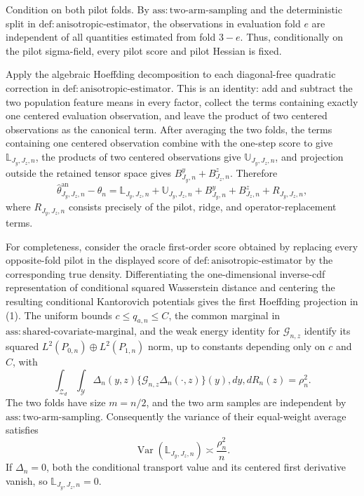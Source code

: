 Condition on both pilot folds.  By \(\mathrm{ass{:}two\text{-}arm\text{-}sampling}\) and the deterministic split in \(\mathrm{def{:}anisotropic\text{-}estimator}\), the observations in evaluation fold \(e\) are independent of all quantities estimated from fold \(3-e\).  Thus, conditionally on the pilot sigma-field, every pilot score and pilot Hessian is fixed.

Apply the algebraic Hoeffding decomposition to each diagonal-free quadratic correction in \(\mathrm{def{:}anisotropic\text{-}estimator}\).  This is an identity: add and subtract the two population feature means in every factor, collect the terms containing exactly one centered evaluation observation, and leave the product of two centered observations as the canonical term.  After averaging the two folds, the terms containing one centered observation combine with the one-step score to give \(\mathbb L_{J_y,J_z,n}\), the products of two centered observations give \(\mathbb U_{J_y,J_z,n}\), and projection outside the retained tensor space gives \(B^y_{J_y,n}+B^z_{J_z,n}\).  Therefore
\[
\widehat\theta^{\mathrm{an}}_{J_y,J_z,n}-\theta_n
=\mathbb L_{J_y,J_z,n}+\mathbb U_{J_y,J_z,n}
+B^y_{J_y,n}+B^z_{J_z,n}+R_{J_y,J_z,n},                                  \tag{1}
\]
where \(R_{J_y,J_z,n}\) consists precisely of the pilot, ridge, and operator-replacement terms.

For completeness, consider the oracle first-order score obtained by replacing every opposite-fold pilot in the displayed score of \(\mathrm{def{:}anisotropic\text{-}estimator}\) by the corresponding true density.  Differentiating the one-dimensional inverse-cdf representation of conditional squared Wasserstein distance and centering the resulting conditional Kantorovich potentials gives the first Hoeffding projection in (1).  The uniform bounds \(c\le q_{a,n}\le C\), the common marginal in \(\mathrm{ass{:}shared\text{-}covariate\text{-}marginal}\), and the weak energy identity for \(\mathcal G_{n,z}\) identify its squared \(L^2(P_{0,n})\oplus L^2(P_{1,n})\) norm, up to constants depending only on \(c\) and \(C\), with
\[
\int_{\mathcal Z_d}\int_{\mathcal Y}
\Delta_n(y,z)\{\mathcal G_{n,z}\Delta_n(\cdot,z)\}(y),dy,dR_n(z)
=\rho_n^2.                                                               \tag{2}
\]
The two folds have size \(m=n/2\), and the two arm samples are independent by \(\mathrm{ass{:}two\text{-}arm\text{-}sampling}\).  Consequently the variance of their equal-weight average satisfies
\[
\operatorname{Var}(\mathbb L_{J_y,J_z,n})\asymp\frac{\rho_n^2}{n}.       \tag{3}
\]
If \(\Delta_n=0\), both the conditional transport value and its centered first derivative vanish, so \(\mathbb L_{J_y,J_z,n}=0\).

